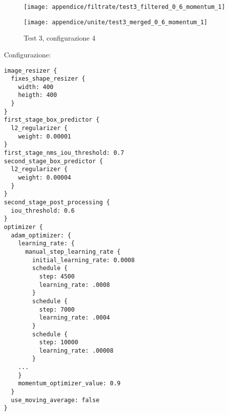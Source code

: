 \newpage
\begin{figure}[H]  
    \begin{minipage}{.5\columnwidth}  
        \centering  
        \texttt{[image: appendice/filtrate/test3\_filtered\_0\_6\_momentum\_1]}  
    \end{minipage}%
    \begin{minipage}{0.5\columnwidth}  
        \centering  
        \texttt{[image: appendice/unite/test3\_merged\_0\_6\_momentum\_1]}  
    \end{minipage}  
    \caption{Test 3, configurazione 4}
\end{figure}%
Configurazione:
\begin{multicols}{2}
    \begin{lstlisting}
image_resizer {
  fixes_shape_resizer {
    width: 400
    heigth: 400
  }
}
first_stage_box_predictor {
  l2_regularizer {
    weight: 0.00001
}
first_stage_nms_iou_threshold: 0.7
second_stage_box_predictor {
  l2_regularizer {
    weight: 0.00004
  }
}
second_stage_post_processing {
  iou_threshold: 0.6
}
optimizer {
  adam_optimizer: {
    learning_rate: {
      manual_step_learning_rate {
        initial_learning_rate: 0.0008
        schedule {
          step: 4500
          learning_rate: .0008
        }
        schedule {
          step: 7000
          learning_rate: .0004
        }
        schedule {
          step: 10000
          learning_rate: .00008
        }
    ...
    }
    momentum_optimizer_value: 0.9
  }
  use_moving_average: false
}
    \end{lstlisting}
\end{multicols}


